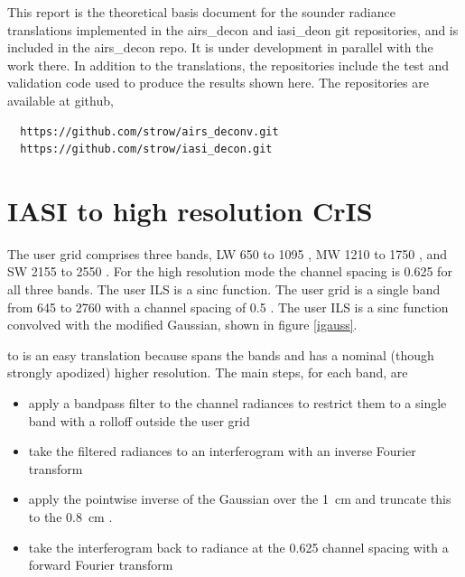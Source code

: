 \documentclass[12pt]{article}
\begin{document}
This report is the theoretical basis document for the sounder
radiance translations implemented in the airs\_decon and iasi\_deon
git repositories, and is included in the airs\_decon repo.  It is
under development in parallel with the work there.  In addition to
the translations, the repositories include the test and validation
code used to produce the results shown here.  The repositories are
available at github,
\begin{verbatim}
  https://github.com/strow/airs_deconv.git
  https://github.com/strow/iasi_decon.git
\end{verbatim}


\section{IASI to high resolution CrIS}

The {\cris} user grid comprises three bands, LW 650 to 1095 {\wn},
MW 1210 to 1750 {\wn}, and SW 2155 to 2550 {\wn}.  For the {\cris}
high resolution mode the channel spacing is 0.625 {\wn} for all
three bands.  The {\cris} user ILS is a sinc function.  The {\iasi}
user grid is a single band from 645 to 2760 {\wn} with a channel
spacing of 0.5 {\wn}.  The {\iasi} user ILS is a sinc function
convolved with the modified Gaussian, shown in figure \ref{igauss}.

{\iasi} to {\cris} is an easy translation because {\iasi} spans the
{\cris} bands and has a nominal (though strongly apodized) higher
resolution.  The main steps, for each {\cris} band, are

\begin{itemize}

  \item apply a bandpass filter to the {\iasi} channel radiances to
    restrict them to a single {\cris} band with a rolloff outside the
    {\cris} user grid

  \item take the filtered radiances to an interferogram with an
    inverse Fourier transform

  \item apply the pointwise inverse of the {\iasi} Gaussian over the 
    {\iasi} 1~cm {\opd} and truncate this to the 0.8~cm {\cris} {\opd}.

  \item take the interferogram back to radiance at the {\cris}
    0.625 {\wn} channel spacing with a forward Fourier transform

\end{itemize}
\end{document}
